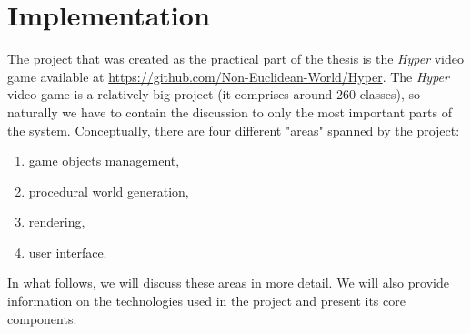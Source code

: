 \chapter{Implementation} \label{ch:implementation}
The project that was created as the practical part of the thesis is the \textit{Hyper} video game available at \url{https://github.com/Non-Euclidean-World/Hyper}.
The \textit{Hyper} video game is a relatively big project (it comprises around 260 classes), so naturally we have to contain the discussion to only the most important parts of the system.
Conceptually, there are four different "areas" spanned by the project:
\begin{enumerate}
  \item game objects management,
  \item procedural world generation,
  \item rendering,
  \item user interface.
\end{enumerate}

In what follows, we will discuss these areas in more detail.
We will also provide information on the technologies used in the project and present its core components.







